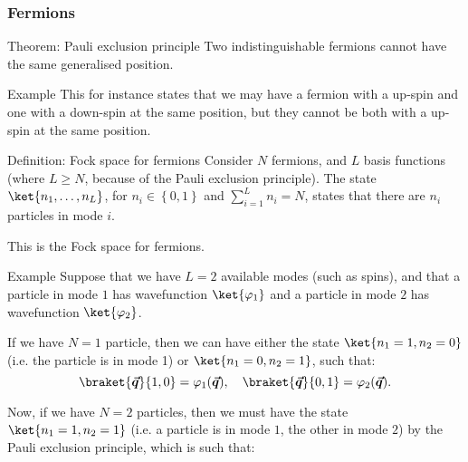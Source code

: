 \documentclass[a4paper]{article}
\begin{document}
\subsubsection{Fermions}

\begin{parag}{Theorem: Pauli exclusion principle}
    Two indistinguishable fermions cannot have the same generalised position.

    \begin{subparag}{Example}
        This for instance states that we may have a fermion with a up-spin and one with a down-spin at the same position, but they cannot be both with a up-spin at the same position.
    \end{subparag}
\end{parag}

\begin{parag}{Definition: Fock space for fermions}
    Consider $N$ fermions, and $L$ basis functions (where $L \geq N$, because of the Pauli exclusion principle). The state $\ket{n_1, \ldots, n_L}$, for $n_i \in \left\{0, 1\right\}$ and $\sum_{i=1}^{L} n_i = N$, states that there are $n_i$ particles in mode $i$.

    This is the Fock space for fermions.

    \begin{subparag}{Example}
        Suppose that we have $L = 2$ available modes (such as spins), and that a particle in mode $1$ has wavefunction $\ket{\phi_1}$ and a particle in mode $2$ has wavefunction $\ket{\phi_2}$. 

        If we have $N = 1$ particle, then we can have either the state $\ket{n_1 = 1, n_2 = 0}$ (i.e. the particle is in mode 1) or $\ket{n_1 = 0, n_2 = 1}$, such that: 
        \[\braket{\bvec{q}}{1, 0} = \phi_1\left(\bvec{q}\right), \mathspace \braket{\bvec{q}}{0, 1} = \phi_2\left(\bvec{q}\right).\]
        
        Now, if we have $N = 2$ particles, then we must have the state $\ket{n_1 = 1, n_2 = 1}$ (i.e. a particle is in mode $1$, the other in mode $2$) by the Pauli exclusion principle, which is such that:


\end{subparag}
\end{parag}
\end{document}
